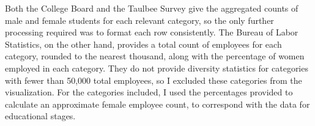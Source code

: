Both the College Board and the Taulbee Survey give the aggregated counts of male and female students for each relevant category, so the only further processing required was to format each row consistently. The Bureau of Labor Statistics, on the other hand, provides a total count of employees for each category, rounded to the nearest thousand, along with the percentage of women employed in each category. They do not provide diversity statistics for categories with fewer than 50,000 total employees, so I excluded these categories from the visualization. For the categories included, I used the percentages provided to calculate an approximate female employee count, to correspond with the data for educational stages.
